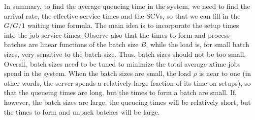 \begin{comment}
\begin{exercise}
  Suppose a single machine workstation has to process $n$ different
  product families. Jobs of family $i$ arrive as a Poisson process
  with rate $\lambda_i$.  Service times are exponentially distributed
  with average $\mu_i^{-1}$ for family $i$. A setup of time $S$ is
  required if the machine switches from one family to another. If the
  machine works according to a cyclic schedule, i.e., produce family
  1, then 2, then 3, and so on until family $n$, Can you find batch
  sizes $B_i$ for family $i$ such that an average waiting time can be
  guaranteed?
  \begin{solution}
    \TBD. 

    This problem can be generalized and has been widely studied as one
    of the core problems in stochastic machine scheduling. For
    instance, what to do if the setup times are family-dependent, or
    even more general, dependent on the sequence in which the families
    are planned? This is a very hard problem. 
  \end{solution}
\end{exercise}
\end{comment}


In summary, to find the average  queueing time in the system, we need to find the arrival rate, the effective service times and the SCVs, so that we can fill in the $G/G/1$ waiting time formula. The main idea is to incorporate the setup times into the job service times. Observe also that the times to form and process batches are linear functions of the batch size $B$, while the load is, for small batch sizes, very sensitive to the batch size. Thus, batch sizes should not be too small.  Overall, batch sizes need to be tuned to minimize the total average xtime jobs spend in the system. When the batch sizes are small, the load $\rho$ is near to one (in other words, the server spends a relatively large fraction of its time on setups), so that the queueing times are long, but the times to form a batch are small. If, however, the batch sizes are large, the queueing times will be relatively short, but the times to form and unpack batches will be large. 



